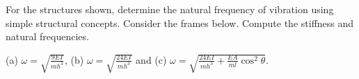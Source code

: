 
\begin{Exercise}[label={frames_frequency}]
For the structures shown, determine the natural frequency of vibration using simple structural concepts.
Consider the frames below. Compute the stiffness and natural frequencies.

\begin{center}
    \hspace{2em}
    \hspace{2em}
\end{center}

\shortAnswer(a) $\omega = \sqrt{\frac{9EI}{mh^3}}$, (b) $\omega = \sqrt{\frac{24EI}{mh^3}}$ and (c) $\omega = \sqrt{\frac{24EI}{mh^3}+\frac{EA}{ml}\cos^2\theta}$.
\end{Exercise}



